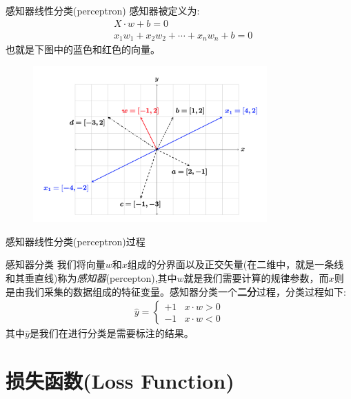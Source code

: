 \documentclass[handout]{ctexbeamer}
\begin{document}
\begin{frame}{感知器线性分类(perceptron)}
感知器被定义为:
\begin{align*}
	& X \cdot w + b  = 0 \\
	& x_1 w_1 + x_2 w_2 + \cdots + x_n w_n + b  =0
\end{align*}	
也就是下图中的蓝色和红色的向量。
\begin{figure}[H]
	\centering
	\includegraphics[width=0.8\textwidth]{fig/C2C2dotprodt}
\end{figure}	
\end{frame}

\begin{frame}{感知器线性分类(perceptron)过程}
	\begin{block}{感知器分类}
	我们将向量$w$和$x$组成的分界面以及正交矢量(在二维中，就是一条线和其垂直线)称为\textit{感知器}(percepton),其中$w$就是我们需要计算的规律参数，而$x$则是由我们采集的数据组成的特征变量。感知器分类一个\textbf{二分}过程，分类过程如下:
	\begin{align*}
		\hat{y} = \begin{cases}
			+1 & x \cdot w > 0 \\
			-1 & x \cdot w < 0
		\end{cases}
	\end{align*}
	其中$\hat{y}$是我们在进行分类是需要标注的结果。	
	\end{block}

\end{frame}


\section{损失函数(Loss Function)}
\end{document}
